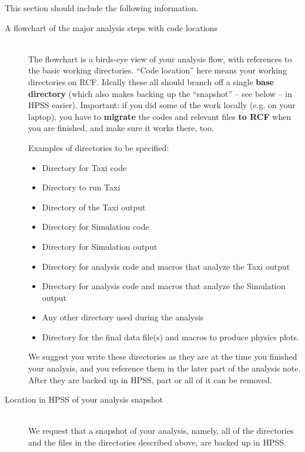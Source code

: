 \documentclass[12pt]{article}
\begin{document}
This section should include the following information.
\begin{description}
\item [A flowchart of the major analysis steps with code locations]~\\
The flowchart is a birds-eye view of your analysis flow, with
references to the basic working directories.
``Code location'' here means your working directories on RCF.
Ideally these all should branch off a single {\bf base directory} (which
also makes backing up the ``snapshot'' -- see below -- in HPSS easier).
Important: if you did some of the work locally (e.g. on your laptop),
you have to {\bf migrate} the codes and relevant files {\bf to RCF} 
when you are finished, and make sure it works there, too. 

Examples of directories to be specified:
\begin{itemize}
\item Directory for Taxi code
\item Directory to run Taxi
\item Directory of the Taxi output
\item Directory for Simulation code
\item Directory for Simulation output
\item Directory for analysis code and macros that analyze the Taxi output
\item Directory for analysis code and macros that analyze the Simulation output
\item Any other directory used during the analysis
\item Directory for the final data file(s) and macros to produce physics plots.
\end{itemize}
We suggest you write these directories as they are at the time you
finished your analysis, and you reference them in the later part of 
the analysis note.  After they are backed up in HPSS, part or all of
it can be removed.  
 
\item [Location in HPSS of your analysis snapshot]~\\
We request that a snapshot of your analysis, namely, all of the 
directories and the files in the directories described above, are
backed up in HPSS.  


\end{description}
\end{document}
